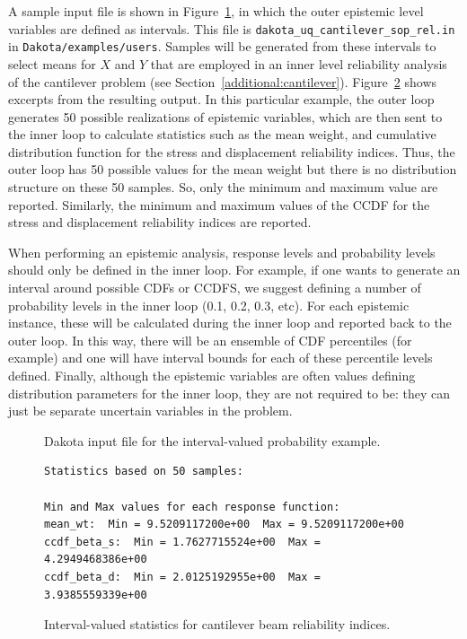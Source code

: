 A sample input file is shown in
Figure~\ref{adv_models:2ndprob}, in which the outer epistemic level
variables are defined as intervals.  This file is
\texttt{dakota\_uq\_cantilever\_sop\_rel.in} in
\texttt{Dakota/examples/users}.  Samples will be generated from
these intervals to select means for $X$ and $Y$ that are employed in
an inner level reliability analysis of the cantilever problem (see
Section~\ref{additional:cantilever}).
Figure~\ref{adv_models:2ndprob_res} shows excerpts from the resulting
output.  In this particular example, the outer loop generates 50
possible realizations of epistemic variables, which are then sent to
the inner loop to calculate statistics such as the mean weight, and
cumulative distribution function for the stress and displacement
reliability indices.  Thus, the outer loop has 50 possible values for
the mean weight but there is no distribution structure on these 50
samples.  So, only the minimum and maximum value are reported.
Similarly, the minimum and maximum values of the CCDF for the stress
and displacement reliability indices are reported.

When performing an epistemic analysis, response levels and 
probability levels should only be defined in the inner loop. 
For example, if one wants to generate an interval around possible 
CDFs or CCDFS, we suggest defining a number of probability levels 
in the inner loop (0.1, 0.2, 0.3, etc).  For each epistemic instance, 
these will be calculated during the inner loop and reported back to the 
outer loop.  In this way, there will be an ensemble of CDF percentiles 
(for example) and one will have interval bounds for each of these 
percentile levels defined.  Finally, although the epistemic variables are 
often values defining distribution parameters for the inner loop, 
they are not required to be: they can just be separate uncertain variables 
in the problem. 
\begin{figure}
  \centering
  \begin{bigbox}
    \begin{tiny}
    \end{tiny}
  \end{bigbox}
  \caption{Dakota input file for the interval-valued probability example.}
  \label{adv_models:2ndprob}
\end{figure}

\begin{figure}
\centering
\begin{bigbox}
\begin{small}
\begin{verbatim}
Statistics based on 50 samples:

Min and Max values for each response function:
mean_wt:  Min = 9.5209117200e+00  Max = 9.5209117200e+00
ccdf_beta_s:  Min = 1.7627715524e+00  Max = 4.2949468386e+00
ccdf_beta_d:  Min = 2.0125192955e+00  Max = 3.9385559339e+00
\end{verbatim}
\end{small}
\end{bigbox}
\caption{Interval-valued statistics for cantilever beam reliability indices.}
\label{adv_models:2ndprob_res}
\end{figure}

